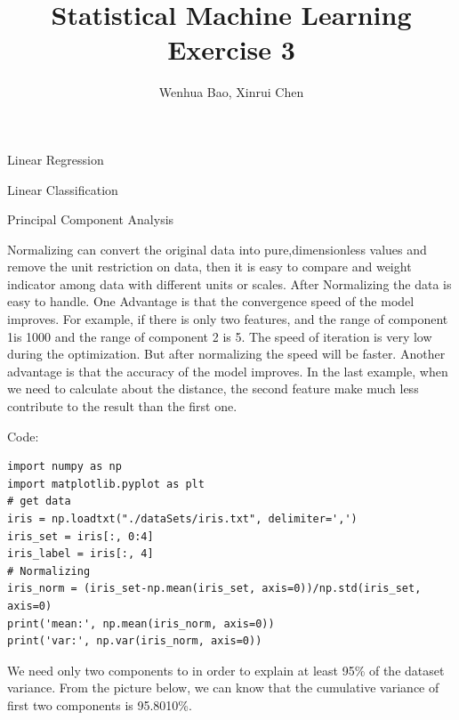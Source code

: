 \documentclass[
	ngerman,
	]{tudaexercise}
\begin{document}
\title[Übung TUDaExercise]{Statistical Machine Learning \\ Exercise 3}
\author{Wenhua Bao, Xinrui Chen}


\maketitle
\begin{task}{Linear Regression}

\end{task}

\begin{task}{Linear Classification}

\end{task}

\begin{task}{Principal Component Analysis}

\begin{subtask}
Normalizing can convert the original data into pure,dimensionless values and remove the unit restriction on data, then it is easy to compare and weight indicator among data with different units or scales. After Normalizing the data is easy to handle. One Advantage is that the convergence speed of the model improves. For example, if there is only two features, and the range of component 1is 1000 and the range of component 2 is 5. The speed of iteration is very low during the optimization. But after normalizing the speed will be faster. Another advantage is that the accuracy of the model improves. In the last example, when we need to calculate about the distance, the second feature make much less contribute to the result than the first one.

Code:
\begin{lstlisting}
import numpy as np
import matplotlib.pyplot as plt
# get data
iris = np.loadtxt("./dataSets/iris.txt", delimiter=',')
iris_set = iris[:, 0:4]
iris_label = iris[:, 4]
# Normalizing
iris_norm = (iris_set-np.mean(iris_set, axis=0))/np.std(iris_set, axis=0)
print('mean:', np.mean(iris_norm, axis=0))
print('var:', np.var(iris_norm, axis=0))
\end{lstlisting}

\end{subtask}

\begin{subtask}
We need only two components to in order to explain at least 95\% of the dataset variance. From the picture below, we can know that the cumulative variance of first two components is 95.8010\%.\\


\end{subtask}
\end{task}
\end{document}
